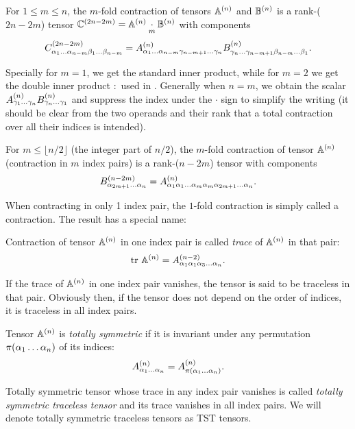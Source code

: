 \begin{definition}\label{def:contraction}
  For $1\leq m \leq n$, the $m$-fold contraction of tensors $\AA$ and $\BB$ is a rank-($2n-2m$) tensor 
  $\CC[2n-2m] = \AA\underset{m}{\cdot}\BB$ with components
  $$
    \CCC[2n-2m]{\alpha_{1}\ldots\alpha_{n-m}\beta_1\ldots\beta_{n-m}} = 
    \AAA{\alpha_1\ldots\alpha_{n-m}\gamma_{n-m+1}\ldots\gamma_n}\BBB{\gamma_n\ldots\gamma_{n-m+1}\beta_{n-m}\ldots\beta_1}.
  $$
\end{definition}
Specially for $m = 1$, we get the standard inner product, while for $m = 2$ we get the double inner product $:$ used in
. Generally when $n = m$, we obtain the scalar $\AAA{\gamma_1\ldots\gamma_n}\BBB{\gamma_n\ldots\gamma_1}$
and suppress the index under the $\cdot$ sign to simplify the writing (it should be clear from the two operands and their 
rank that a total contraction over all their indices is intended).

\begin{definition}
  For $m \leq \lfloor n/2 \rfloor$ (the integer part of $n/2$), the $m$-fold contraction of tensor $\AA$ (contraction 
  in $m$ index pairs) is a rank-($n-2m$) tensor with components
  $$
    \BBB[n-2m]{\alpha_{2m+1}\ldots\alpha_n} = \AAA{\alpha_1\alpha_1\ldots\alpha_m\alpha_m\alpha_{2m+1}\ldots\alpha_n}.
  $$
\end{definition}
When contracting in only 1 index pair, the $1$-fold contraction is simply called a contraction. The result has a special 
name:
\begin{definition}\label{def:trace}
  Contraction of tensor $\AA$ in one index pair is called \textit{trace} of $\AA$ in that pair:
  $$
    \trace \AA = \AAA[n-2]{\alpha_1\alpha_1\alpha_3\ldots\alpha_n}.
  $$ 
\end{definition}
If the trace of $\AA$ in one index pair vanishes, the tensor is said to be traceless in that pair. Obviously then, if 
the tensor does not depend on the order of indices, it is traceless in all index pairs.
\begin{definition}
  Tensor $\AA$ is \textit{totally symmetric} if it is invariant under any permutation $\perm{\alpha_1\ldots\alpha_n}$ 
  of its indices:
  $$
    \AAA{\alpha_1\ldots\alpha_n} = \AAA{\perm{\alpha_1\ldots\alpha_n}}.
  $$
\end{definition}

\begin{definition}
  Totally symmetric tensor whose trace in any index pair vanishes is called \textit{totally symmetric traceless tensor} 
  and its trace vanishes in all index pairs. We will denote totally symmetric traceless tensors as TST tensors.
\end{definition}


